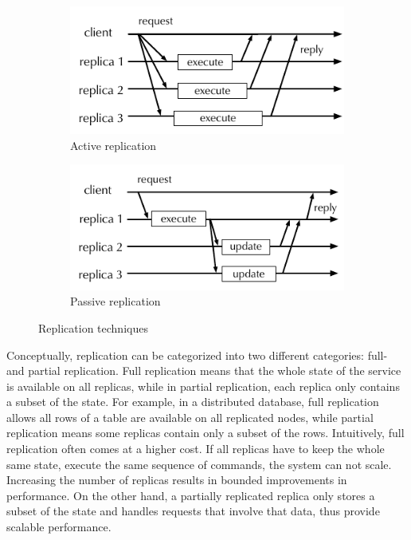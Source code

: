\begin{figure}[ht!]
  \centering
  \begin{subfigure}[b]{0.49\textwidth}
    \centering
    \includegraphics[width=1\columnwidth]{figures/replication-active}
    \caption{Active replication}
    \label{fig:replication:active}
  \end{subfigure}
  \begin{subfigure}[b]{0.49\textwidth}
    \centering
    \includegraphics[width=1\columnwidth]{figures/replication-passive}
    \caption{Passive replication}
    \label{fig:replication:passive}
  \end{subfigure}
  \caption{Replication techniques}
  \label{fig:replication}
\end{figure}

Conceptually, replication can be categorized into two different categories:
full- and partial replication. Full replication means that the whole state of
the service is available on all replicas, while in partial replication, each
replica only contains a subset of the state. For example, in a distributed
database, full replication allows all rows of a table are available on all
replicated nodes, while partial replication means some replicas contain only a
subset of the rows. Intuitively, full replication often comes at a higher cost. If
all replicas have to keep the whole same state, execute the same sequence of
commands, the system can not scale. Increasing the number of replicas results in
bounded improvements in performance. On the other hand, a partially replicated
replica only stores a subset of the state and handles requests that involve that
data, thus provide scalable performance.

